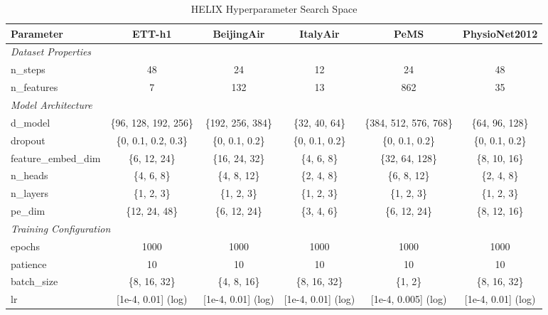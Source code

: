 


\begin{table}[H]
\centering
\caption{HELIX Hyperparameter Search Space}
\label{tab:hyperparam_helix}
\begin{adjustbox}{max width=\textwidth}
\begin{small}
\begin{tabular}{l|ccccc}
\toprule
\textbf{Parameter} & \textbf{ETT-h1} & \textbf{BeijingAir} & \textbf{ItalyAir} & \textbf{PeMS} & \textbf{PhysioNet2012} \\
\midrule
\multicolumn{6}{l}{\textit{Dataset Properties}} \\
n\_steps & 48 & 24 & 12 & 24 & 48 \\
n\_features & 7 & 132 & 13 & 862 & 35 \\
\midrule
\multicolumn{6}{l}{\textit{Model Architecture}} \\
d\_model & \{96, 128, 192, 256\} & \{192, 256, 384\} & \{32, 40, 64\} & \{384, 512, 576, 768\} & \{64, 96, 128\} \\
dropout & \{0, 0.1, 0.2, 0.3\} & \{0, 0.1, 0.2\} & \{0, 0.1, 0.2\} & \{0, 0.1, 0.2\} & \{0, 0.1, 0.2\} \\
feature\_embed\_dim & \{6, 12, 24\} & \{16, 24, 32\} & \{4, 6, 8\} & \{32, 64, 128\} & \{8, 10, 16\} \\
n\_heads & \{4, 6, 8\} & \{4, 8, 12\} & \{2, 4, 8\} & \{6, 8, 12\} & \{2, 4, 8\} \\
n\_layers & \{1, 2, 3\} & \{1, 2, 3\} & \{1, 2, 3\} & \{1, 2, 3\} & \{1, 2, 3\} \\
pe\_dim & \{12, 24, 48\} & \{6, 12, 24\} & \{3, 4, 6\} & \{6, 12, 24\} & \{8, 12, 16\} \\
\midrule
\multicolumn{6}{l}{\textit{Training Configuration}} \\
epochs & 1000 & 1000 & 1000 & 1000 & 1000 \\
patience & 10 & 10 & 10 & 10 & 10 \\
batch\_size & \{8, 16, 32\} & \{4, 8, 16\} & \{8, 16, 32\} & \{1, 2\} & \{8, 16, 32\} \\
lr & [1e-4, 0.01] (log) & [1e-4, 0.01] (log) & [1e-4, 0.01] (log) & [1e-4, 0.005] (log) & [1e-4, 0.01] (log) \\

\end{tabular}
\end{small}
\end{adjustbox}
\end{table}
